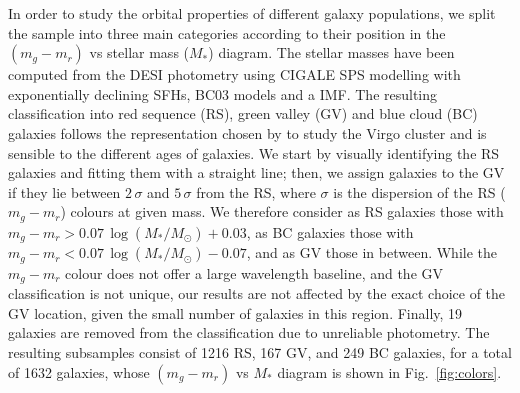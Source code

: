 \documentclass{aa}
\begin{document}

In order to study the orbital properties of different galaxy populations, we split the sample into three main categories according to their position in the $(m_g-m_r)$ vs stellar mass ($M_*$) diagram. The stellar masses have been computed from the DESI photometry using CIGALE \citep{Boquien2019} SPS modelling with exponentially declining SFHs, BC03 models and a \cite{Chabrier2003} IMF.
The resulting classification into red sequence (RS), green valley (GV) and blue cloud (BC) galaxies follows the representation chosen by \citet{Boselli_2014} to study the Virgo cluster and is sensible to the different ages of galaxies. We start by visually identifying the RS galaxies and fitting them with a straight line; then, we assign galaxies to the GV 
if they lie between $2\,\sigma$ and $5\,\sigma$ from the RS, where $\sigma$ is the dispersion of 
the RS ($m_g-m_r$) colours at given mass.
We therefore consider as RS galaxies those with $m_g-m_r>0.07 \,\log(M_*/M_\odot) + 0.03$, as BC galaxies those with $m_g-m_r<0.07\, \log(M_*/M_\odot) - 0.07$, and as GV those in between. While the $m_g-m_r$ colour does not offer a large wavelength baseline, and the GV classification is not unique, our results are not affected by the exact choice of the GV location, given the small number of galaxies in this region.
Finally, 19 galaxies are removed from the classification due to unreliable photometry. The resulting subsamples consist of 1216 RS, 167 GV, and 249 BC galaxies, for a total of 1632 galaxies, whose $(m_g-m_r)$ vs $M_*$ diagram is shown in Fig.~\ref{fig:colors}.
\end{document}
